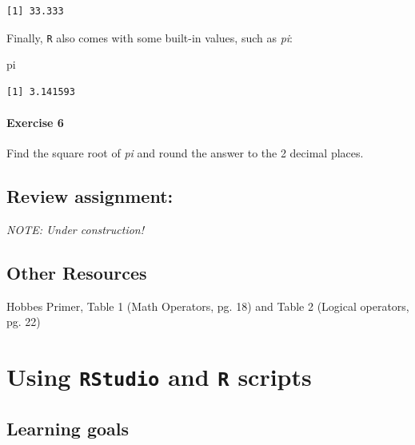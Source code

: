\documentclass[
]{book}
\newenvironment{Shaded}{\begin{snugshade}}{\end{snugshade}}
\newcommand{\NormalTok}[1]{#1}
\begin{document}
\begin{verbatim}
[1] 33.333
\end{verbatim}

Finally, \texttt{R} also comes with some built-in values, such as \emph{pi}:

\begin{Shaded}
\begin{Highlighting}[]
\NormalTok{pi}
\end{Highlighting}
\end{Shaded}

\begin{verbatim}
[1] 3.141593
\end{verbatim}

\hypertarget{exercise-6}{%
\subsubsection*{Exercise 6}\label{exercise-6}}

Find the square root of \emph{pi} and round the answer to the 2 decimal places.

\hypertarget{review-assignment}{%
\section*{Review assignment:}\label{review-assignment}}

\emph{NOTE: Under construction!}

\hypertarget{other-resources}{%
\section{Other Resources}\label{other-resources}}

Hobbes Primer, Table 1 (Math Operators, pg. 18) and Table 2 (Logical operators, pg. 22)

\hypertarget{using-rstudio-and-r-scripts}{%
\chapter{\texorpdfstring{Using \texttt{RStudio} and \texttt{R} scripts}{Using RStudio and R scripts}}\label{using-rstudio-and-r-scripts}}

\hypertarget{learning-goals-1}{%
\section*{Learning goals}\label{learning-goals-1}}
\end{document}
